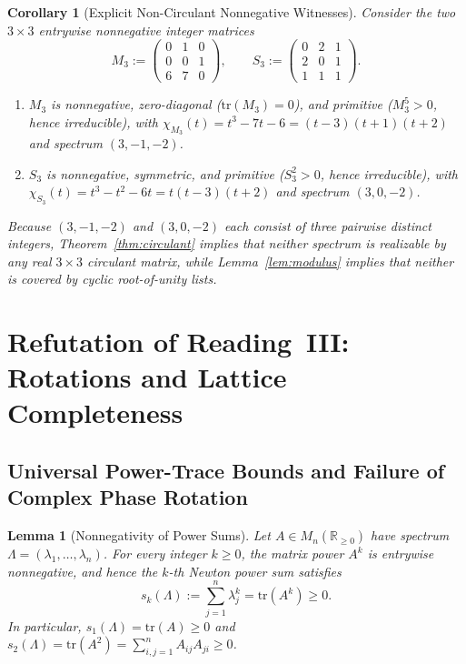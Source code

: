 \documentclass[11pt]{article}
\newtheorem{lemma}[theorem]{Lemma}
\newtheorem{corollary}[theorem]{Corollary}
\theoremstyle{definition}
\theoremstyle{remark}
\begin{document}
\begin{corollary}[Explicit Non-Circulant Nonnegative Witnesses]\label{cor:noncirculant}
Consider the two $3 \times 3$ entrywise nonnegative integer matrices
\[
  M_3 := \begin{pmatrix} 0 & 1 & 0 \\ 0 & 0 & 1 \\ 6 & 7 & 0 \end{pmatrix},
  \qquad
  S_3 := \begin{pmatrix} 0 & 2 & 1 \\ 2 & 0 & 1 \\ 1 & 1 & 1 \end{pmatrix}.
\]
\begin{enumerate}
  \item $M_3$ is nonnegative, zero-diagonal ($\mathrm{tr}(M_3) = 0$), and primitive
    ($M_3^5 > 0$, hence irreducible), with $\chi_{M_3}(t) = t^3 - 7t - 6 =
    (t - 3)(t + 1)(t + 2)$ and spectrum $(3, -1, -2)$.
  \item $S_3$ is nonnegative, symmetric, and primitive ($S_3^2 > 0$, hence irreducible),
    with $\chi_{S_3}(t) = t^3 - t^2 - 6t = t(t - 3)(t + 2)$ and spectrum $(3, 0, -2)$.
\end{enumerate}
Because $(3, -1, -2)$ and $(3, 0, -2)$ each consist of three pairwise distinct integers,
Theorem~\ref{thm:circulant} implies that neither spectrum is realizable by \emph{any} real
$3 \times 3$ circulant matrix, while Lemma~\ref{lem:modulus} implies that neither is
covered by cyclic root-of-unity lists.
\end{corollary}

\section{Refutation of Reading~III: Rotations and Lattice Completeness}

\subsection{Universal Power-Trace Bounds and Failure of Complex Phase Rotation}

\begin{lemma}[Nonnegativity of Power Sums]\label{lem:powertrace}
Let $A \in M_n(\mathbb{R}_{\ge 0})$ have spectrum $\Lambda = (\lambda_1, \dots,
\lambda_n)$. For every integer $k \ge 0$, the matrix power $A^k$ is entrywise nonnegative,
and hence the $k$-th Newton power sum satisfies
\[
  s_k(\Lambda) := \sum_{j=1}^n \lambda_j^k = \mathrm{tr}(A^k) \ge 0.
\]
In particular, $s_1(\Lambda) = \mathrm{tr}(A) \ge 0$ and $s_2(\Lambda) = \mathrm{tr}(A^2)
= \sum_{i,j=1}^n A_{ij} A_{ji} \ge 0$.
\end{lemma}
\end{document}

